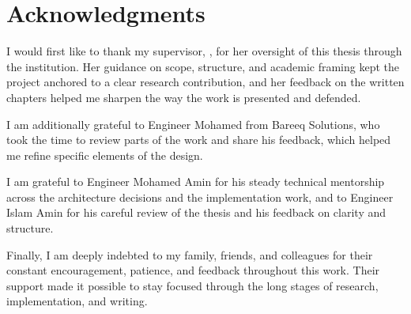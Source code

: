 \chapter*{Acknowledgments}

I would first like to thank my supervisor, \supervisorOne, for her
oversight of this thesis through the institution. Her guidance on
scope, structure, and academic framing kept the project anchored to a
clear research contribution, and her feedback on the written chapters
helped me sharpen the way the work is presented and defended.

I am additionally grateful to Engineer Mohamed from Bareeq Solutions,
who took the time to review parts of the work and share his feedback,
which helped me refine specific elements of the design.

I am grateful to Engineer Mohamed Amin for his steady technical
mentorship across the architecture decisions and the implementation
work, and to Engineer Islam Amin for his careful review of the thesis
and his feedback on clarity and structure.

Finally, I am deeply indebted to my family, friends, and colleagues
for their constant encouragement, patience, and feedback throughout
this work. Their support made it possible to stay focused through
the long stages of research, implementation, and writing.

